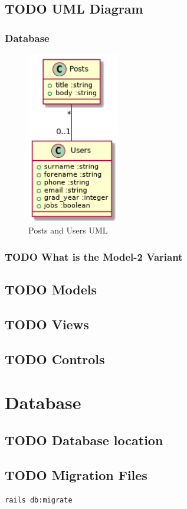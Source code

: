 \documentclass[a4paper]{article}
\begin{document}
\subsection{{\bfseries\sffamily TODO} UML Diagram}
\label{sec-3-1}
\subsubsection{Database}
\label{sec-3-1-1}
\begin{center}
\begin{figure}[htb]
\centering
\includegraphics[width=4cm]{posts-users.png}
\caption{Posts and Users UML}
\end{figure}
\end{center}

\subsubsection{{\bfseries\sffamily TODO} What is the Model-2 Variant}
\label{sec-3-1-2}
\subsection{{\bfseries\sffamily TODO} Models}
\label{sec-3-2}
\subsection{{\bfseries\sffamily TODO} Views}
\label{sec-3-3}
\subsection{{\bfseries\sffamily TODO} Controls}
\label{sec-3-4}


\section{Database}
\label{sec-4}

\subsection{{\bfseries\sffamily TODO} Database location}
\label{sec-4-1}

\subsection{{\bfseries\sffamily TODO} Migration Files}
\label{sec-4-2}
\begin{verbatim}
rails db:migrate
\end{verbatim}
\end{document}

